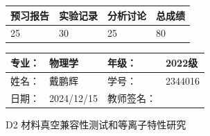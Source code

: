 \documentclass[dvipsnames, svgnames,a4paper,11pt]{article}
\begin{document}
\begin{table}
	\renewcommand\arraystretch{1.7}
	\begin{tabularx}{\textwidth}{
		|X|X|X|X
		|X|X|X|X|}
	\hline
	\multicolumn{2}{|c|}{预习报告}&\multicolumn{2}{|c|}{实验记录}&\multicolumn{2}{|c|}{分析讨论}&\multicolumn{2}{|c|}{总成绩}\\
	\hline
	\LARGE25 & & \LARGE30 & & \LARGE25 & & \LARGE80 & \\
	\hline
	\end{tabularx}
\end{table}


\begin{table}
	\renewcommand\arraystretch{1.7}
	\begin{tabularx}{\textwidth}{|X|X|X|X|}
	\hline
	专业：& 物理学 &年级：& 2022级\\
	\hline
	姓名：& 戴鹏辉  & 学号： & 2344016 \\
	\hline
	日期：& 2024/12/15 & 教师签名：& \\
	\hline
	\end{tabularx}
\end{table}

\begin{center}
	\LARGE D2 \quad 材料真空兼容性测试和等离子特性研究
\end{center}
\end{document}
